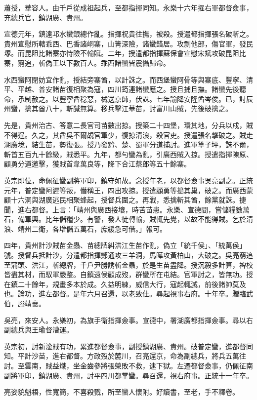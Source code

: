 \begin{pinyinscope}
蕭授，華容人。由千戶從成祖起兵，至都指揮同知。永樂十六年擢右軍都督僉事，充總兵官，鎮湖廣、貴州。

宣德元年，鎮遠邛水蠻銀總作亂。指揮祝貴往撫，被殺。授遣都指揮張名破斬之。貴州宣慰所轄乖西、巴香諸峒寨，山箐深險，諸蠻錯居。攻剽他部，傷官軍，發民塚。而昆阻比諸寨亦恃險不輸賦。二年，授遣都指揮蘇保會宣慰宋斌攻破昆阻比寨，窮追，斬偽王以下數百人。乖西諸蠻皆震懾歸命。

水西蠻阿閉妨宜作亂，授結旁寨酋，以計誅之。而西堡蠻阿骨等與寨底、豐寧、清平、平越、普安諸苗復相聚為寇，四川筠連諸蠻應之。授且捕且撫。諸蠻先後聽命，承制赦之。以豐寧酋稔惡，械送京師，伏誅。七年諭降安隆酋岑俊。已，討辰州蠻，擒其酋八十，斬馘無算。移兵擊江華苗，討富川山賊，先後破擒之。

先是，貴州治古、答意二長官司苗數出掠。授築二十四堡，環其地，分兵以戍，賊不得逞。久之，其酋吳不爾覘官軍少，復掠清浪，殺官吏。授遣張名擊破之。賊走湖廣境，結生苗，勢復張。授乃發黔、楚、蜀軍分道捕討。進軍筸子坪，誅不爾，斬首五百九十餘級，賊悉平。九年，都勻蠻為亂，引廣西賊入掠。授遣指揮陳原、顧勇分道邀擊，獲賊首韋萬良等，降下合江蔡郎等五十餘寨。

英宗即位，命佩征蠻副將軍印，鎮守如故。念授年老，以都督僉事吳亮副之。正統元年，普定蠻阿遲等叛，僭稱王，四出攻掠。授遣顧勇等搗其巢，破之。而廣西蒙顧十六洞與湖廣逃民相聚蜂起，授督兵圍之。再戰，悉擒斬其酋，餘黨就誅。捷聞，進右都督。上言：「靖州與廣西接壤，時苦苗患。永樂、宣德間，嘗儲糧數萬石，備軍興。比年儲糧少。有警，發人徒轉輸，賊輒先覺，以故不能得賊。乞於清浪、靖州二衛，各增儲五萬石，庶緩急可借。」報可。

四年，貴州計沙賊苗金蟲、苗總牌糾洪江生苗作亂，偽立「統千侯」、「統萬侯」號。授督兵抵計沙，分遣都指揮鄭通攻三羊洞，馬曄攻黃柏山，大破之。吳亮窮追至蒲頭、洪江，斬總牌，千戶尹勝誘斬金蟲，於是生苗盡降。授沉毅多計算，裨校皆盡其材，而馭軍嚴整。自鎮遠侯顧成歿，群蠻所在屯結。官軍討之，皆無功。授在鎮二十餘年，規畫多本於成。久益明練，威信大行，寇起輒滅，前後諸帥莫及也。論功，進左都督。是年六月召還，以老致仕。尋起視事右府。十年卒。贈臨武伯，謚靖襄。

吳亮，來安人。永樂初，為旗手衛指揮僉事。宣德中，署湖廣都指揮僉事。尋以右副總兵與王瑜督漕運。

英宗初，討新淦賊有功，累進都督僉事，副授鎮湖廣、貴州。破普定蠻，進都督同知。平計沙苗，進右都督。方政歿於麓川，召亮還京，命為副總兵，將兵五萬往討。至雲南，賊益熾，坐金齒參將張榮敗不救，逮下獄。左遷都督僉事，仍佩征南副將軍印，鎮湖廣、貴州，討平四川都掌蠻。尋召還，視右府事。正統十一年卒。

亮姿貌魁梧，性寬簡，不喜殺戮，所至蠻人懷附。好讀書，至老，手不釋卷。


\end{pinyinscope}
